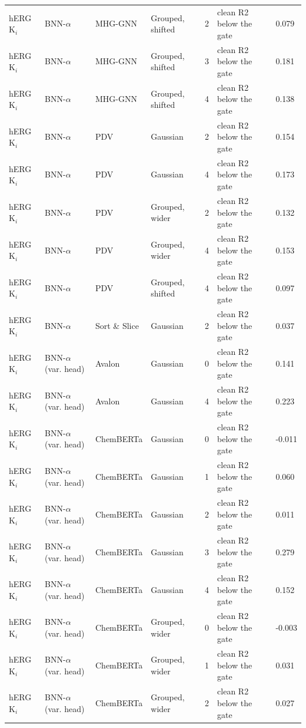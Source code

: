 {\begin{longtable}{llllcll}
hERG K$_i$ & BNN-$\alpha$ & MHG-GNN & Grouped, shifted & 2 & clean R2 below the gate & 0.079 \\
hERG K$_i$ & BNN-$\alpha$ & MHG-GNN & Grouped, shifted & 3 & clean R2 below the gate & 0.181 \\
hERG K$_i$ & BNN-$\alpha$ & MHG-GNN & Grouped, shifted & 4 & clean R2 below the gate & 0.138 \\
hERG K$_i$ & BNN-$\alpha$ & PDV & Gaussian & 2 & clean R2 below the gate & 0.154 \\
hERG K$_i$ & BNN-$\alpha$ & PDV & Gaussian & 4 & clean R2 below the gate & 0.173 \\
hERG K$_i$ & BNN-$\alpha$ & PDV & Grouped, wider & 2 & clean R2 below the gate & 0.132 \\
hERG K$_i$ & BNN-$\alpha$ & PDV & Grouped, wider & 4 & clean R2 below the gate & 0.153 \\
hERG K$_i$ & BNN-$\alpha$ & PDV & Grouped, shifted & 4 & clean R2 below the gate & 0.097 \\
hERG K$_i$ & BNN-$\alpha$ & Sort \& Slice & Gaussian & 2 & clean R2 below the gate & 0.037 \\
hERG K$_i$ & BNN-$\alpha$ (var. head) & Avalon & Gaussian & 0 & clean R2 below the gate & 0.141 \\
hERG K$_i$ & BNN-$\alpha$ (var. head) & Avalon & Gaussian & 4 & clean R2 below the gate & 0.223 \\
hERG K$_i$ & BNN-$\alpha$ (var. head) & ChemBERTa & Gaussian & 0 & clean R2 below the gate & -0.011 \\
hERG K$_i$ & BNN-$\alpha$ (var. head) & ChemBERTa & Gaussian & 1 & clean R2 below the gate & 0.060 \\
hERG K$_i$ & BNN-$\alpha$ (var. head) & ChemBERTa & Gaussian & 2 & clean R2 below the gate & 0.011 \\
hERG K$_i$ & BNN-$\alpha$ (var. head) & ChemBERTa & Gaussian & 3 & clean R2 below the gate & 0.279 \\
hERG K$_i$ & BNN-$\alpha$ (var. head) & ChemBERTa & Gaussian & 4 & clean R2 below the gate & 0.152 \\
hERG K$_i$ & BNN-$\alpha$ (var. head) & ChemBERTa & Grouped, wider & 0 & clean R2 below the gate & -0.003 \\
hERG K$_i$ & BNN-$\alpha$ (var. head) & ChemBERTa & Grouped, wider & 1 & clean R2 below the gate & 0.031 \\
hERG K$_i$ & BNN-$\alpha$ (var. head) & ChemBERTa & Grouped, wider & 2 & clean R2 below the gate & 0.027 \\

\end{longtable}}
